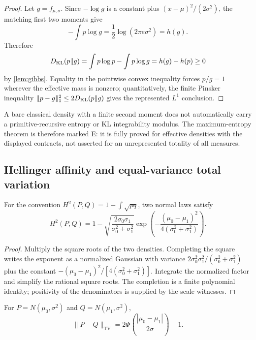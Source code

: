 \begin{proof}
Let $g=f_{\mu,\sigma}$.  Since $-\log g$ is a constant plus $(x-\mu)^2/(2\sigma^2)$, the matching first two moments give
\[
 -\int p\log g=\frac12\log(2\pi e\sigma^2)=h(g).
\]
Therefore
\[
 D_{\mathrm{KL}}(p\Vert g)=\int p\log p-\int p\log g=h(g)-h(p)\ge0
\]
by \cref{lem:gibbs}.  Equality in the pointwise convex inequality forces $p/g=1$ wherever the effective mass is nonzero; quantitatively, the finite Pinsker inequality
$\|p-g\|_1^2\le2D_{\mathrm{KL}}(p\Vert g)$ gives the represented $L^1$ conclusion.
\end{proof}

\begin{remark}
A bare classical density with a finite second moment does not automatically carry a primitive-recursive entropy or KL integrability modulus.  The maximum-entropy theorem is therefore marked E: it is fully proved for effective densities with the displayed contracts, not asserted for an unrepresented totality of all measures.
\end{remark}

\subsection{Hellinger affinity and equal-variance total variation}

\begin{theorem}\label{thm:hellinger}
For the convention
$H^2(P,Q)=1-\int\sqrt{pq}$, two normal laws satisfy
\begin{equation}\label{eq:hellinger}
 H^2(P,Q)=1-
 \sqrt{\frac{2\sigma_0\sigma_1}{\sigma_0^2+\sigma_1^2}}
 \exp\!\left(-\frac{(\mu_0-\mu_1)^2}{4(\sigma_0^2+\sigma_1^2)}\right).
\end{equation}
\end{theorem}

\begin{proof}
Multiply the square roots of the two densities.  Completing the square writes the exponent as a normalized Gaussian with variance
$2\sigma_0^2\sigma_1^2/(\sigma_0^2+\sigma_1^2)$ plus the constant
$-(\mu_0-\mu_1)^2/[4(\sigma_0^2+\sigma_1^2)]$.  Integrate the normalized factor and simplify the rational square roots.  The completion is a finite polynomial identity; positivity of the denominators is supplied by the scale witnesses.
\end{proof}

\begin{proposition}\label{prop:tv-equal-scale}
For $P=N(\mu_0,\sigma^2)$ and $Q=N(\mu_1,\sigma^2)$,
\begin{equation}\label{eq:tv-equal-scale}
 \|P-Q\|_{\mathrm{TV}}
 =2\Phi\!\left(\frac{|\mu_0-\mu_1|}{2\sigma}\right)-1.
\end{equation}
\end{proposition}

